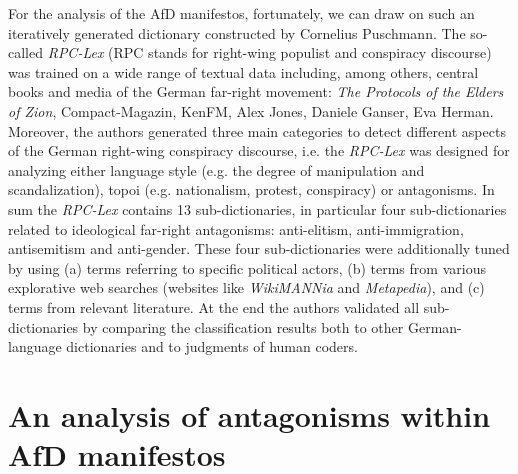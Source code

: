 \documentclass[a4paper]{scrreprt}
\begin{document}
For the analysis of the AfD manifestos, fortunately, we can draw on such an iteratively generated dictionary constructed by Cornelius Puschmann. \citep{puschmann:2022} The so-called {\em RPC-Lex} (RPC stands for right-wing populist and conspiracy discourse) was trained on a wide range of textual data including, among others, central books and media of the German far-right movement: {\em The Protocols of the Elders of Zion}, Compact-Magazin, KenFM, Alex Jones, Daniele Ganser, Eva Herman. \cite[p.~1153]{puschmann:2022} Moreover, the authors generated three main categories to detect different aspects of the German right-wing conspiracy discourse, i.e. the {\em RPC-Lex} was designed for analyzing either language style (e.g. the degree of manipulation and scandalization), topoi (e.g. nationalism, protest, conspiracy) or antagonisms. In sum the {\em RPC-Lex} contains 13 sub-dictionaries, in particular four sub-dictionaries related to ideological far-right antagonisms: anti-elitism, anti-immigration, antisemitism and anti-gender. These four sub-dictionaries were additionally tuned by using (a) terms referring to specific political actors, (b) terms from various explorative web searches (websites like {\em WikiMANNia} and {\em Metapedia}), and (c) terms from relevant literature. \cite[p.~1154/55]{puschmann:2022} At the end the authors validated all sub-dictionaries by comparing the classification results both to other German-language dictionaries and to judgments of human coders.
\chapter{An analysis of antagonisms within AfD manifestos}
\end{document}
